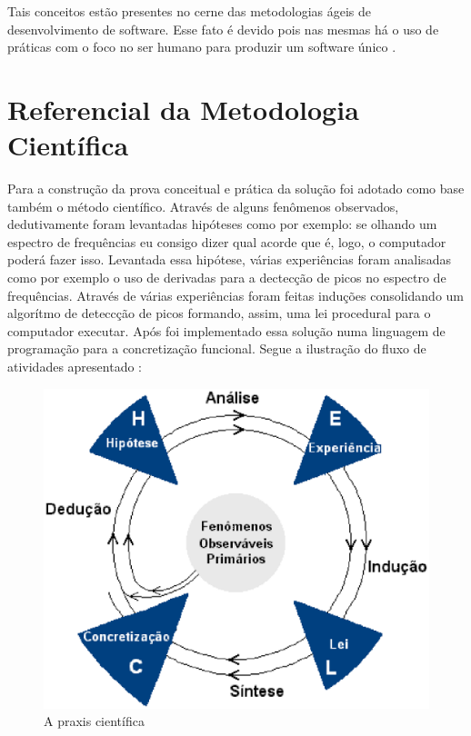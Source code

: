 Tais conceitos estão presentes no cerne das metodologias ágeis de desenvolvimento de software. Esse fato é devido pois nas mesmas há o uso de práticas com o foco no ser humano para produzir um software único \cite{agile}.

\section{Referencial da Metodologia Científica}
\label{sec:referencialmetodocientifico}

Para a construção da prova conceitual e prática da solução foi adotado como base também o método científico. Através de alguns fenômenos observados, dedutivamente foram levantadas hipóteses como por exemplo: se olhando um espectro de frequências eu consigo dizer qual acorde que é, logo, o computador poderá fazer isso. Levantada essa hipótese, várias experiências foram analisadas como por exemplo o uso de derivadas para a dectecção de picos no espectro de frequências. Através de várias experiências foram feitas induções consolidando um algorítmo de deteccção de picos formando, assim, uma lei procedural para o computador executar. Após foi implementado essa solução numa linguagem de programação para a concretização funcional. Segue a ilustração do fluxo de atividades apresentado \cite{metodo}:

\begin{figure}[h]
  \centering
    \includegraphics[keepaspectratio=true,scale=0.7]{figuras/metodologia.eps}
  \caption{A praxis científica}
\end{figure}




